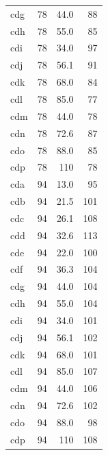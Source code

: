 \documentclass{article}
\begin{document}
\begin{center}
\begin{longtable}{L{0.2} R{0.18} R{0.2} R{0.2}}
						cdg & 78 & 44.0 & 88 \\
						cdh & 78 & 55.0 & 85\\
						cdi & 78 & 34.0 & 97 \\
						cdj & 78 & 56.1 & 91 \\
						cdk & 78 & 68.0 & 84 \\
						cdl & 78 & 85.0 & 77 \\
						cdm & 78 & 44.0 & 78 \\
						cdn & 78 & 72.6 & 87 \\
						cdo & 78 & 88.0 & 85 \\
						cdp & 78 & 110 & 78 \\
						cda & 94 & 13.0 & 95 \\
						cdb & 94 & 21.5 & 101 \\
						cdc & 94 & 26.1 & 108 \\
						cdd & 94 & 32.6 & 113 \\
						cde & 94 & 22.0 & 100 \\
						cdf & 94 & 36.3 & 104 \\
						cdg & 94 & 44.0 & 104 \\
						cdh & 94 & 55.0 & 104 \\
						cdi & 94 & 34.0 & 101 \\
						cdj & 94 & 56.1 & 102 \\
						cdk & 94 & 68.0 & 101 \\
						cdl & 94 & 85.0 & 107 \\
						cdm & 94 & 44.0 & 106 \\
						cdn & 94 & 72.6 & 102 \\
						cdo & 94 & 88.0 & 98 \\
						cdp & 94 & 110 & 108 \\
						
					\end{longtable}
			\end{center}
		
\end{document}

